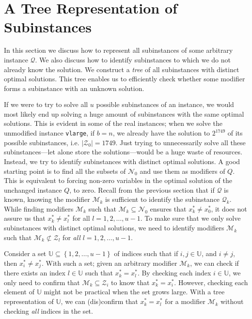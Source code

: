 \section{A Tree Representation of Subinstances}
In this section we discuss how to represent all subinstances of some arbitrary
instance $\mathcal{Q}$. We also discuss how to identify 
subinstances to which we do not already know the solution.
We construct a \emph{tree} of all subinstances with distinct optimal solutions.
This tree enables us to efficiently check whether some modifier forms a
subinstance with an unknown solution.

If we were to try to solve all $u$ possible subinstances of an
instance, we would most likely end up solving a huge amount of subinstances
with the same optimal solutions. This is evident in some of the real
instances; when we solve the unmodified instance \texttt{vlarge}, if $b = n$,
we already have the solution to $2^{1749}$ of its possible subinstances, i.e.
$|\mathcal{Z}_0| = 1749$.
Just trying to unnecessarily solve all these subinstances---let alone store the
solutions---would be a huge waste of resources.
Instead, we try to identify subinstances with distinct optimal solutions.
A good starting point is to find all the subsets of $\mathcal{N}_0$ and
use them as modifiers of $Q$. This is equivalent to forcing non-zero
variables in the optimal solution of the unchanged instance $Q$, to zero.
Recall from the previous section that if $\mathcal{Q}$ is known, knowing the
modifier $\mathcal{M}_k$ is sufficient to identify the subinstance
$\mathcal{Q}_k$.
While finding modifiers $\mathcal{M}_k$ such that
$\mathcal{M}_k \subseteq \mathcal{N}_0$ ensures that $x_k^*\neq x_0^*$,
it does not assure us that $x_k^* \neq x_l^*$ for all $l=1,2,\ldots,u-1$.
To make sure that we only solve subinstances with distinct optimal solutions,
we need to identify modifiers $\mathcal{M}_k$ such that
$\mathcal{M}_k \not \subset \mathcal{Z}_l$
for \emph{all} $l=1,2,\ldots,u-1$.

Consider a set $\mathbb{U}\subseteq \left\{{1,2,\ldots,u-1}\right\}$ of indices
such that if $i,j \in \mathbb{U}$, and $i \neq j$, then $x_i^* \neq x_j^*$.
With such a set; given an arbitrary modifier $\mathcal{M}_k$, we can check
if there exists an index $l \in \mathbb{U}$ such that $x_k^* = x_l^*$. By
checking each index $i \in \mathbb{U}$, we only need to confirm that
$\mathcal{M}_k \subseteq \mathcal{Z}_i$ to know that $x_k^* = x_i^*$. However,
checking each element of $\mathbb{U}$ might not be practical when the set
grows large. With a tree representation of $\mathbb{U}$, we can (dis)confirm
that $x_k^* = x_l^*$ for a modifier $\mathcal{M}_k$ without checking \emph{all}
indices in the set.

